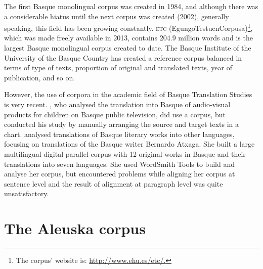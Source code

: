 \documentclass[output=paper]{LSP/langsci}
\begin{document}
The first Basque monolingual corpus was created in 1984, and although there was a considerable hiatus until the next corpus was created (2002), generally speaking, this field has been growing constantly. \textsc{etc} (EgungoTestuenCorpusa)\footnote{The corpus' website is: \url{http://www.ehu.es/etc/.}}, which was made freely available in 2013, contains 204.9 million words and is the largest Basque monolingual corpus created to date. The Basque Institute of the University of the Basque Country has created a reference corpus balanced in terms of type of texts, proportion of original and translated texts, year of publication, and so on.

However, the use of corpora in the academic field of Basque Translation Studies is very recent. \citet{Barambones2012}, who analysed the translation into Basque of audio-visual products for children on Basque public television, did use a corpus, but conducted his study by manually arranging the source and target texts in a chart. \citet{Manterola2011} analysed translations of Basque literary works into other languages, focusing on translations of the Basque writer Bernardo Atxaga. She built a large multilingual digital parallel corpus with 12 original works in Basque and their translations into seven languages. She used WordSmith Tools \citep{Scott2004} to build and analyse her corpus, but encountered problems while aligning her corpus at sentence level and the result of alignment at paragraph level was quite unsatisfactory.

\section{The Aleuska corpus} \label{sec:3:2}
\end{document}
